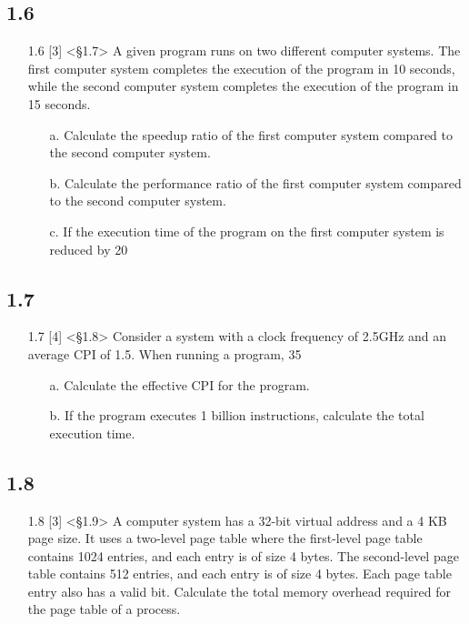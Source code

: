 \documentclass{article}
\begin{document}
\subsection*{1.6}
\begin{enumerate}
    \item[1.6] [3] <§1.7> A given program runs on two different computer systems. The first computer system completes the execution of the program in 10 seconds, while the second computer system completes the execution of the program in 15 seconds.
    \begin{enumerate}
        \item[a.] Calculate the speedup ratio of the first computer system compared to the second computer system.
        \item[b.] Calculate the performance ratio of the first computer system compared to the second computer system.
        \item[c.] If the execution time of the program on the first computer system is reduced by 20%
    \end{enumerate}
\end{enumerate}

\subsection*{1.7}
\begin{enumerate}
    \item[1.7] [4] <§1.8> Consider a system with a clock frequency of 2.5GHz and an average CPI of 1.5. When running a program, 35%
    \begin{enumerate}
        \item[a.] Calculate the effective CPI for the program.
        \item[b.] If the program executes 1 billion instructions, calculate the total execution time.
    \end{enumerate}
\end{enumerate}

\subsection*{1.8}
\begin{enumerate}
    \item[1.8] [3] <§1.9> A computer system has a 32-bit virtual address and a 4 KB page size. It uses a two-level page table where the first-level page table contains 1024 entries, and each entry is of size 4 bytes. The second-level page table contains 512 entries, and each entry is of size 4 bytes. Each page table entry also has a valid bit. Calculate the total memory overhead required for the page table of a process.
\end{enumerate}
\end{document}
